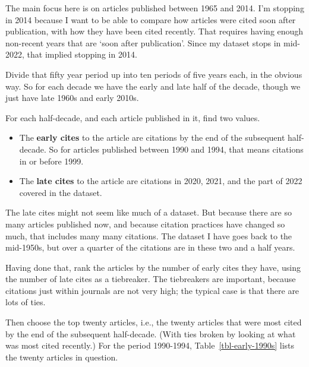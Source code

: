 \documentclass[
  10pt,
  letterpaper,
  DIV=11,
  numbers=noendperiod,
  twoside]{scrartcl}
\providecommand{\tightlist}{%
  \setlength{\itemsep}{0pt}\setlength{\parskip}{0pt}}\usepackage{longtable,booktabs,array}
\begin{document}
The main focus here is on articles published between 1965 and 2014. I'm
stopping in 2014 because I want to be able to compare how articles were
cited soon after publication, with how they have been cited recently.
That requires having enough non-recent years that are `soon after
publication'. Since my dataset stops in mid-2022, that implied stopping
in 2014.

Divide that fifty year period up into ten periods of five years each, in
the obvious way. So for each decade we have the early and late half of
the decade, though we just have late 1960s and early 2010s.

For each half-decade, and each article published in it, find two values.

\begin{itemize}
\tightlist
\item
  The \textbf{early cites} to the article are citations by the end of
  the subsequent half-decade. So for articles published between 1990 and
  1994, that means citations in or before 1999.
\item
  The \textbf{late cites} to the article are citations in 2020, 2021,
  and the part of 2022 covered in the dataset.
\end{itemize}

The late cites might not seem like much of a dataset. But because there
are so many articles published now, and because citation practices have
changed so much, that includes many many citations. The dataset I have
goes back to the mid-1950s, but over a quarter of the citations are in
these two and a half years.

Having done that, rank the articles by the number of early cites they
have, using the number of late cites as a tiebreaker. The tiebreakers
are important, because citations just within journals are not very high;
the typical case is that there are lots of ties.

Then choose the top twenty articles, i.e., the twenty articles that were
most cited by the end of the subsequent half-decade. (With ties broken
by looking at what was most cited recently.) For the period 1990-1994,
Table~\ref{tbl-early-1990s} lists the twenty articles in question.
\end{document}
